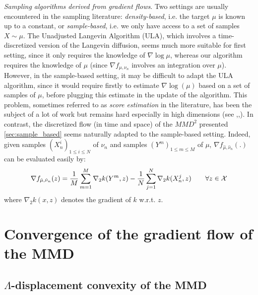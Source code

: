 \textit{Sampling algorithms derived from gradient flows}. Two settings are usually encountered in the sampling literature: \textit{density-based}, i.e. the target $\mu$ is known up to a constant, or \textit{sample-based}, i.e. we only have access to a set of samples $X \sim \mu$.
	The Unadjusted Langevin Algorithm (ULA), which involves a time-discretized version of the Langevin diffusion, seems much more suitable for first setting, since it only requires the knowledge of $\nabla \log \mu$, whereas our algorithm requires the knowledge of $\mu$ (since $\nabla f_{\mu, \nu_n}$ involves an integration over $\mu$). However, in the sample-based setting, it may be difficult to adapt the ULA algorithm, since it would require firstly to estimate $\nabla \log(\mu)$ based on a set of samples of $\mu$, before plugging this estimate in the update of the algorithm. This problem, sometimes referred to as \textit{score estimation} in the literature, has been the subject of a lot of work but remains hard especially in high dimensions (see \cite{sutherland2017efficient},\cite{li2018gradient},\cite{shi2018spectral}). In contrast, the discretized flow (in time and space) of the $MMD^2$ presented \cref{sec:sample_based} seems naturally adapted to the sample-based setting. Indeed, given samples $(X_{n}^{i})_{1\le i\le N}$ of $\nu_n$ and samples $(Y^m)_{1 \le m \le M}$ of $\mu$, $\nabla f_{\hat{\mu},\hat{\nu}_n}(.)$ can be evaluated easily by:
	\begin{align}
		 \nabla f_{\hat{\mu},\hat{\nu}_n}(z) = \frac{1}{M}\sum\limits_{m=1}^M \nabla_2 k(Y^m,z)-\frac{1}{N}\sum\limits_{j=1}^N \nabla_2 k(X_n^j,z) \qquad \forall z\in{{\mathcal X}}
	\end{align}
	where $\nabla_2 k(x,z)$ denotes the gradient of $k$ w.r.t. $z$. 




\section{Convergence of the gradient flow of the MMD}\label{sec:appendix_convergence}
\subsection{$\Lambda$-displacement convexity of the MMD}\label{subsec:appendix_lambda_convexity}

